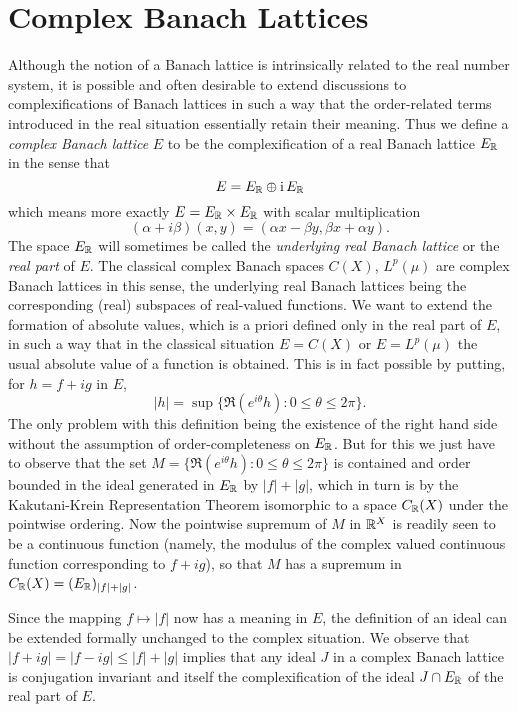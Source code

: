 \section{Complex Banach Lattices}\label{sec:c1-7}

Although the notion of a Banach lattice is intrinsically related to the real number system, it is possible and often desirable to extend discussions to complexifications of Banach lattices in such a way that the order-related terms introduced in the real situation essentially retain their meaning.
Thus we define a \emph{complex Banach lattice} $ E $ to be the complexification of a real Banach lattice $ E_{\mathbb{R}} $ in the sense that
\[
E = E_{\mathbb{R}} \oplus \mathrm{i}\, E_{\mathbb{R}}
\]
which means more exactly $ E = E_{\mathbb{R}} \times E_{\mathbb{R}} $ with scalar multiplication 
%
\[
	 (\alpha+i\beta)(x,y) = (\alpha x-\beta y,\beta x+\alpha y)  .
\]
%
The space $ E_{\mathbb{R}} $ will sometimes be called the \emph{underlying real Banach lattice} or the \emph{real part} of $ E $.
The classical complex Banach spaces $ C(X) $, $ L^{p}(\mu) $ are complex Banach lattices in this sense, the underlying real Banach lattices being the corresponding (real) subspaces of real-valued functions.
We want to extend the formation of absolute values, which is a priori defined only in the real part of $ E $, in such a way that in the classical situation $ E = C(X) $ or $ E = L^{p}(\mu) $ the usual absolute value of a function is obtained.
This is in fact possible by putting, for $ h = f + ig $ in $ E $,
\[
	|h| = \sup\{ \Re(e^{i\theta}h) \colon 0 \leq \theta \leq 2\pi \}.
\]
The only problem with this definition being the existence of the right hand side without the assumption of order-completeness on $ E_{\mathbb{R}} $.
But for this we just have to observe that the set $ M = \{\Re(e^{i\theta}h) \colon 0 \leq \theta \leq 2\pi\} $ is contained and order bounded in the ideal generated in $ E_{\mathbb{R}} $ by $ |f| + |g| $, which in turn is by the Kakutani-Krein Representation Theorem isomorphic to a space $ C_{\mathbb{R}}(X) $ under the pointwise ordering.
Now the pointwise supremum of $ M $ in $ \mathbb{R}^{X} $ is readily seen to be a continuous function (namely, the modulus of the complex valued continuous function corresponding to $ f + ig $), so that $ M $ has a supremum in $ C_{\mathbb{R}}(X) = (E_{\mathbb{R}})_{|f|+|g|} $.

Since the mapping $ f \mapsto |f| $ now has a meaning in $ E $, the definition of an ideal can be extended formally unchanged to the complex situation.
We observe that $ |f+ig| = |f-ig| \leq |f|+|g| $ implies that any ideal $ J $ in a complex Banach lattice is conjugation invariant and itself the complexification of the ideal $ J \cap E_{\mathbb{R}} $ of the real part of $ E $.

